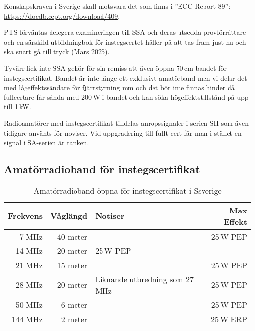 Konskapskraven i Sverige skall motsvara det som finns i ''ECC Report 89'': \\
\url{https://docdb.cept.org/download/409}.

PTS förväntas delegera examineringen till SSA och deras utsedda provförrättare
och en särskild utbildningbok för instegscertet håller på att tas fram just nu
och ska snart gå till tryck (Mars 2025).

Tyvärr fick inte SSA gehör för sin remiss att även öppna 70\,cm bandet för
instegscertifikat. Bandet är inte länge ett exklusivt amatörband men vi delar
det med lågeffektssändare för fjärrstyrning mm och det bör inte finnas hinder då
fullcertare får sända med 200\,W i bandet och kan söka högeffektstillstånd på
upp till 1\,kW.

Radioamatörer med instegscertifikat tilldelas anropssignaler i serien SH som
även tidigare använts för noviser. Vid uppgradering till fullt cert får man i
stället en signal i SA-serien är tanken.

\subsection{Amatörradioband för instegscertifikat}

\begin{table}[H]
\centering
\begin{tabular}{rrlr}
  \textbf{Frekvens} & \textbf{Våglängd} & \textbf{Notiser}               & \textbf{Max Effekt} \\ \hline
              7 MHz &          40 meter &                                &           25\,W PEP \\
             14 MHz &          20 meter & 25\,W PEP                      &                     \\
             21 MHz &          15 meter &                                &           25\,W PEP \\
             28 MHz &          20 meter & Liknande utbredning som 27 MHz &           25\,W PEP \\
             50 MHz &           6 meter &                                &           25\,W PEP \\ \hline
            144 MHz &           2 meter &                                &           25\,W ERP


\end{tabular}
\caption{Amatörradioband öppna för instegscertifikat i Ssverige}
\end{table}

